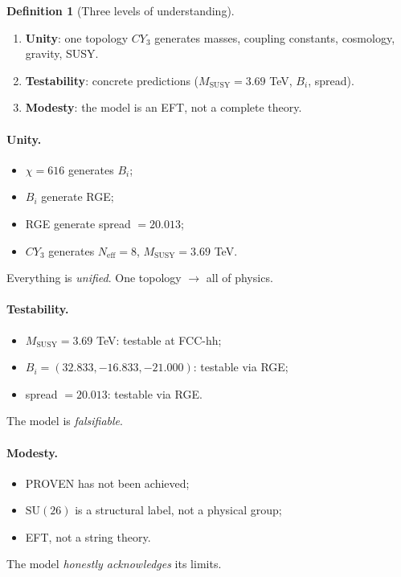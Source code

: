 \documentclass[11pt,a4paper]{article}
\newcommand{\SU}{\mathrm{SU}}
\newcommand{\CY}{CY_3}
\newcommand{\Neff}{N_{\text{eff}}}
\newcommand{\MSUSY}{M_{\text{SUSY}}}
\theoremstyle{definition}
\newtheorem{definition}[theorem]{Definition}
\begin{document}
\begin{definition}[Three levels of understanding]
\label{def:three-understanding}
\begin{enumerate}
    \item \textbf{Unity}: one topology $\CY$ generates 
          masses, coupling constants, cosmology, gravity, SUSY.
    \item \textbf{Testability}: concrete predictions 
          ($\MSUSY = 3.69$ TeV, $B_i$, spread).
    \item \textbf{Modesty}: the model is an EFT, not a complete theory.
\end{enumerate}
\end{definition}

\paragraph{Unity.}
\begin{itemize}
    \item $\chi = 616$ generates $B_i$;
    \item $B_i$ generate RGE;
    \item RGE generate spread $= 20.013$;
    \item $\CY$ generates $\Neff = 8$, $\MSUSY = 3.69$ TeV.
\end{itemize}
Everything is \emph{unified}. One topology $\to$ all of physics.

\paragraph{Testability.}
\begin{itemize}
    \item $\MSUSY = 3.69$ TeV: testable at FCC-hh;
    \item $B_i = (32.833, -16.833, -21.000)$: testable via RGE;
    \item spread $= 20.013$: testable via RGE.
\end{itemize}
The model is \emph{falsifiable}.

\paragraph{Modesty.}
\begin{itemize}
    \item PROVEN has not been achieved;
    \item $\SU(26)$ is a structural label, not a physical group;
    \item EFT, not a string theory.
\end{itemize}
The model \emph{honestly acknowledges} its limits.
\end{document}
